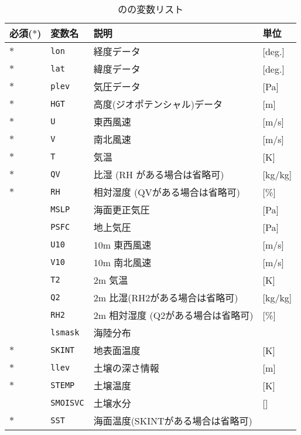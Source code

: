 \begin{table}[htb]
\begin{center}
\caption{のの変数リスト}
\begin{tabularx}{150mm}{ll|l|X} \hline
 \rowcolor[gray]{0.9} 必須($\ast$) & 変数名 & 説明 & 単位\\ \hline
$\ast$ & \verb|lon|  & 経度データ & [deg.] \\
$\ast$ &\verb|lat|  & 緯度データ & [deg.] \\
$\ast$ &\verb|plev| & 気圧データ & [Pa] \\
$\ast$ &\verb|HGT|  & 高度(ジオポテンシャル)データ& [m] \\
$\ast$ &\verb|U|    & 東西風速 & [m/s] \\
$\ast$ &\verb|V|    & 南北風速 & [m/s] \\
$\ast$ &\verb|T|    & 気温     & [K] \\
$\ast$ &\verb|QV|   & 比湿 (RH がある場合は省略可) & [kg/kg] \\
$\ast$ &\verb|RH|   & 相対湿度 (QVがある場合は省略可) & [\%] \\
   &\verb|MSLP| & 海面更正気圧 & [Pa] \\
   &\verb|PSFC| & 地上気圧 & [Pa] \\
   &\verb|U10|  & 10m 東西風速 & [m/s] \\
   &\verb|V10|  & 10m 南北風速& [m/s] \\
   &\verb|T2|   & 2m 気温  &   [K] \\
   &\verb|Q2|   & 2m 比湿(RH2がある場合は省略可) &[kg/kg] \\
   &\verb|RH2|  & 2m 相対湿度 (Q2がある場合は省略可) & [\%] \\
   &\verb|lsmask| & 海陸分布   &  \\
$\ast$ &\verb|SKINT|  & 地表面温度 & [K] \\
$\ast$ &\verb|llev|   & 土壌の深さ情報 &[m] \\
$\ast$ &\verb|STEMP|  & 土壌温度   & [K] \\
     &\verb|SMOISVC| & 土壌水分   & [] \\
$\ast$ &\verb|SST|     & 海面温度(SKINTがある場合は省略可) & \\
\end{tabularx}
\label{tab:grdvar_item}
\end{center}
\end{table}



